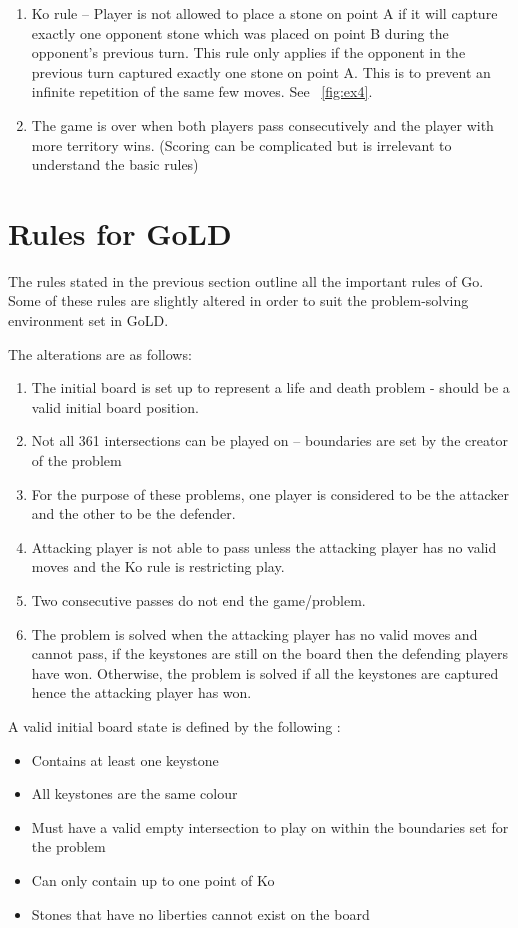 \documentclass{l4proj}
\begin{document}
\begin{enumerate}
  \item Ko rule – Player is not allowed to place a stone on point A if it will capture exactly one opponent stone which was placed on point B during the opponent’s previous turn. This rule only applies if the opponent in the previous turn captured exactly one stone on point A. This is to prevent an infinite repetition of the same few moves. See ~\autoref{fig:ex4}.

  \item The game is over when both players pass consecutively and the player with more territory wins. (Scoring can be complicated but is irrelevant to understand the basic rules)

\end{enumerate}




\section{Rules for GoLD}
The rules stated in the previous section outline all the important rules of Go. Some of these rules are slightly altered in order to suit the problem-solving environment set in GoLD.

The alterations are as follows:
\begin{enumerate}

\item The initial board is set up to represent a life and death problem - should be a valid initial board position.
\item Not all 361 intersections can be played on – boundaries are set by the creator of the problem
\item For the purpose of these problems, one player is considered to be the attacker and the other to be the defender.
\item Attacking player is not able to pass unless the attacking player has no valid moves and the Ko rule is restricting play.
\item Two consecutive passes do not end the game/problem.
\item The problem is solved when the attacking player has no valid moves and cannot pass, if the keystones are still on the board then the defending players have won. Otherwise, the problem is solved if all the keystones are captured hence the attacking player has won.

\end{enumerate}


\bigskip
A valid initial board state is defined by the following :
\begin{itemize}
\item Contains at least one keystone
\item All keystones are the same colour
\item Must have a valid empty intersection to play on within the boundaries set for the problem
\item Can only contain up to one point of Ko
\item Stones that have no liberties cannot exist on the board
\end{itemize}
\end{document}
